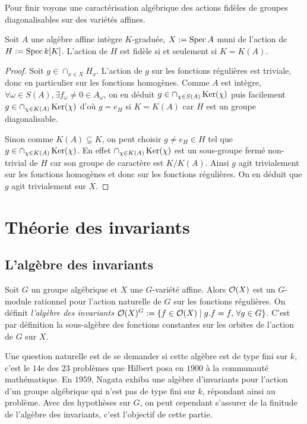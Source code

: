 Pour finir voyons une caractérisation algébrique des actions fidèles de groupes diagonalisables sur des variétés affines.

\begin{prop}
Soit $A$ une algèbre affine intègre $K$-graduée, $X:=\operatorname{Spec} A$ muni de l'action de $H:=\operatorname{Spec} k[K]$. L'action de $H$ est fidèle si et seulement si $K=K(A)$.
\end{prop}
\begin{proof}
Soit $g\in \cap_{x\in X}H_x$. L'action de $g$ sur les fonctions régulières est triviale, donc en particulier sur les fonctions homogènes. Comme $A$ est intègre, $\forall \omega \in S(A), \exists f_\omega\neq 0\in A_\omega$, on en déduit $g\in \cap_{\chi \in S(A)} \operatorname{Ker}(\chi)$ puis facilement $g\in \cap_{\chi \in K(A)} \operatorname{Ker}(\chi)$ d'où $g=e_H$ si $K=K(A)$ car $H$ est un groupe diagonalisable.

Sinon comme $K(A)\subsetneq K$, on peut choisir $g\neq e_H\in H$ tel que $g\in\cap_{\chi \in K(A)} \operatorname{Ker}(\chi)$. En effet $\cap_{\chi \in K(A)} \operatorname{Ker}(\chi)$ est un sous-groupe fermé non-trivial de $H$ car son groupe de caractère est $K/K(A)$. Ainsi $g$ agit trivialement sur les fonctions homogènes et donc sur les fonctions régulières. On en déduit que $g$ agit trivialement sur $X$.
\end{proof}

\section{Théorie des invariants}
\subsection{L'algèbre des invariants}

Soit $G$ un groupe algébrique et $X$ une $G$-variété affine. Alors $\mathcal{O}(X)$ est un $G$-module rationnel pour l'action naturelle de $G$ sur les fonctions régulières. On définit \textit{l'algèbre des invariants} $\mathcal{O}(X)^G:=\lbrace f\in \mathcal{O}(X)\mid g.f=f,\, \forall g\in G\rbrace$. C'est par définition la sous-algèbre des fonctions constantes sur les orbites de l'action de $G$ sur $X$.

Une question naturelle est de se demander si cette algèbre est de type fini sur $k$, c'est le $14$e des $23$ problèmes que Hilbert posa en $1900$ à la communauté mathématique. En $1959$, Nagata exhiba une algèbre d'invariants pour l'action d'un groupe algébrique qui n'est pas de type fini sur $k$, répondant ainsi au problème. Avec des hypothèses sur $G$, on peut cependant s'assurer de la finitude de l'algèbre des invariants, c'est l'objectif de cette partie.

